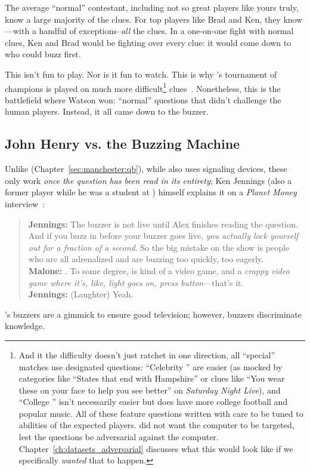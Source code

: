 The average ``normal'' \jeopardy{} contestant, including not so great
players like yours truly, know a large majority of the clues.
%
For top players like Brad and Ken, they know---with a handful of
exceptions--\emph{all} the clues.
%
In a one-on-one fight with normal clues, Ken and Brad would be fighting over
every clue: it would come down to who could buzz first.

This isn't fun to play.
%
Nor is it fun to watch.
%
This is why \jeopardy{}'s tournament of champions is played on much more
difficult\footnote{And it the difficulty doesn't just ratchet in one
  direction, all ``special'' matches use designated questions: ``Celebrity
  \jeopardy{}'' are easier (as mocked by categories like ``States that end
  with Hampshire'' or clues like ``You wear these on your face to help you see
  better'' on \textit{Saturday Night Live}), and ``College \jeopardy{}'' isn't
  necessarily easier but does have more college football and popular music.
  All of these feature questions written with care to be tuned to abilities of
  the expected players.   did not want the computer to be targeted,
  lest the questions be adversarial against the computer.
  Chapter~\ref{ch:datasets_adversarial} discusses what this would look like if we
  specifically \emph{wanted} that to happen.} clues~\citep{harris-06}.
%
Nonetheless, this is the battlefield where Watson won: ``normal''
questions that didn't challenge the human players.
%
Instead, it all came down to the buzzer.

\subsection{John Henry vs. the Buzzing Machine}
\label{sec:watson:human-buzzing}

Unlike \qb{} (Chapter~\ref{sec:manchester:qb}), while \jeopardy{} also uses
signaling devices, these only work \emph{once the question has been
  read in its entirety}; Ken Jennings (also a former \qb{} player while he was a student at
) himself explains it on a \textit{Planet Money}
interview~\citep{malone-19}:
\begin{quote}
{\bf Jennings:} The buzzer is
    not live until Alex finishes reading the question. And if you buzz
    in before your buzzer goes live, \emph{you actually lock yourself out
    for a fraction of a second}. So the big mistake on the show is
    people who are all adrenalized and are buzzing too quickly, too
    eagerly. \\
{\bf Malone:} . To some degree, \jeopardy{} is kind of a video game, and a \emph{crappy video game where it's, like, light goes on, press button}---that's it. \\
{\bf Jennings:} (Laughter) Yeah. \\
\end{quote}
\jeopardy{}'s buzzers are a gimmick to ensure good television; however, \qb{}
buzzers discriminate knowledge.

